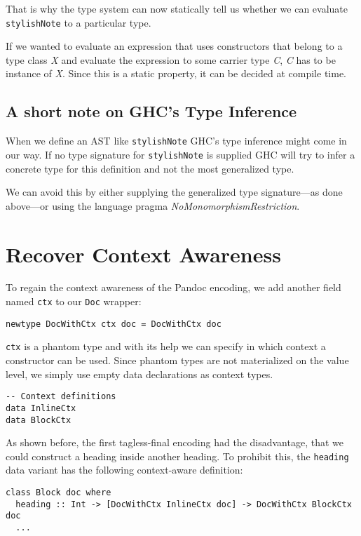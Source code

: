 That is why the type system can now statically tell us whether we can evaluate
\texttt{stylishNote} to a particular type.

If we wanted to evaluate an expression that uses constructors that belong to a
type class \emph{X} and evaluate the expression to some carrier type \emph{C},
\emph{C} has to be instance of \emph{X}. Since this is a static property, it can
be decided at compile time.

\subsection{A short note on GHC’s Type Inference}

When we define an AST like \texttt{stylishNote} GHC’s type inference might come
in our way. If no type signature for \texttt{stylishNote} is supplied GHC will
try to infer a concrete type for this definition and not the most generalized
type.

We can avoid this by either supplying the generalized type signature—as done
above—or using the language pragma \emph{NoMonomorphismRestriction}.

\section{Recover Context Awareness}

To regain the context awareness of the Pandoc encoding, we add another field
named \texttt{ctx} to our \texttt{Doc} wrapper:

\begin{lstlisting}
newtype DocWithCtx ctx doc = DocWithCtx doc
\end{lstlisting}

\texttt{ctx} is a phantom type and with its help we can specify in which context
a constructor can be used. Since phantom types are not materialized on the value
level, we simply use empty data declarations as context types.

\begin{lstlisting}
-- Context definitions
data InlineCtx
data BlockCtx
\end{lstlisting}

As shown before, the first tagless-final encoding had the disadvantage, that we
could construct a heading inside another heading. To prohibit this, the
\texttt{heading} data variant has the following context-aware definition:

\begin{lstlisting}
class Block doc where
  heading :: Int -> [DocWithCtx InlineCtx doc] -> DocWithCtx BlockCtx doc
  ...
\end{lstlisting}

